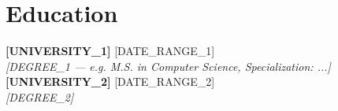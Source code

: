 \documentclass[11pt,a4paper,sans]{moderncv}
\begin{document}
%
%
\section{Education}
\vspace{-0.2em}
\textbf{[UNIVERSITY_1]} \hfill {[DATE_RANGE_1]} \\
\textit{[DEGREE_1 --- e.g. M.S. in Computer Science, Specialization: ...]} \\[0.5em]

\textbf{[UNIVERSITY_2]} \hfill {[DATE_RANGE_2]} \\
\textit{[DEGREE_2]} \\[0.5em]

\vspace{-0.2em}

%
%
\end{document}
